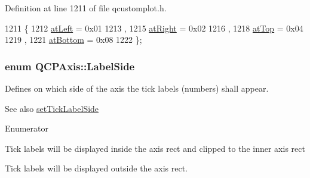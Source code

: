 Definition at line 1211 of file qcustomplot.\+h.


\begin{DoxyCode}
1211                 \{
1212     \hyperlink{class_q_c_p_axis_ae2bcc1728b382f10f064612b368bc18aaf84aa6cac6fb6099f54a2cbf7546b730}{atLeft} = 0x01 
1213     ,
1215     \hyperlink{class_q_c_p_axis_ae2bcc1728b382f10f064612b368bc18aadf5509f7d29199ef2f263b1dd224b345}{atRight} = 0x02 
1216     ,
1218     \hyperlink{class_q_c_p_axis_ae2bcc1728b382f10f064612b368bc18aac0ece2b680d3f545e701f75af1655977}{atTop} = 0x04 
1219     ,
1221     \hyperlink{class_q_c_p_axis_ae2bcc1728b382f10f064612b368bc18aa220d68888516b6c3b493d144f1ba438f}{atBottom} = 0x08 
1222   \};
\end{DoxyCode}
\hypertarget{class_q_c_p_axis_a24b13374b9b8f75f47eed2ea78c37db9}{}
\subsubsection[{Label\+Side}]{\setlength{\rightskip}{0pt plus 5cm}enum {\bf Q\+C\+P\+Axis\+::\+Label\+Side}}\label{class_q_c_p_axis_a24b13374b9b8f75f47eed2ea78c37db9}
Defines on which side of the axis the tick labels (numbers) shall appear.

\begin{DoxySeeAlso}{See also}
\hyperlink{class_q_c_p_axis_a13ec644fc6e22715744c92c6dfa4f0fa}{set\+Tick\+Label\+Side} 
\end{DoxySeeAlso}
\begin{Desc}
\item[Enumerator]\par
\begin{description}
\item[{\em 
\hypertarget{class_q_c_p_axis_a24b13374b9b8f75f47eed2ea78c37db9aae7b027ac2839cf4ad611df30236fc3f}{}ls\+Inside\label{class_q_c_p_axis_a24b13374b9b8f75f47eed2ea78c37db9aae7b027ac2839cf4ad611df30236fc3f}
}]Tick labels will be displayed inside the axis rect and clipped to the inner axis rect \item[{\em 
\hypertarget{class_q_c_p_axis_a24b13374b9b8f75f47eed2ea78c37db9a2eadb509fc0c9a8b35b85c86ec9f3c7a}{}ls\+Outside\label{class_q_c_p_axis_a24b13374b9b8f75f47eed2ea78c37db9a2eadb509fc0c9a8b35b85c86ec9f3c7a}
}]Tick labels will be displayed outside the axis rect. \end{description}
\end{Desc}


